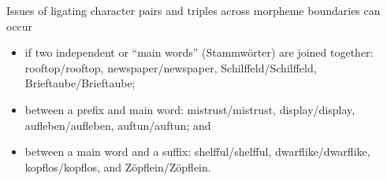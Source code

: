 \documentclass[12pt]{article}
\begin{document}
Issues of ligating character pairs and triples across morpheme boundaries can occur 
\begin{itemize}
\item if two independent or \enquote{main words} (Stammwörter) are joined together: \mbox{rooftop}\slash rooftop, \mbox{newspaper}\slash newspaper, \mbox{Schilffeld}\slash Schilffeld, \mbox{Brieftaube}\slash Brieftaube; \phantom{x}   
\item between a prefix and main word: mi\mbox{st}rust\slash mistrust, di\mbox{sp}lay\slash display, \mbox{aufleben}\slash aufleben, \mbox{auftun}\slash auftun; and \phantom{x}
\item between a main word and a suffix: \mbox{shelfful}\slash shelfful, \mbox{dwarflike}\slash  dwarflike, \mbox{kopflos}\slash kopflos, and \mbox{Zöpflein}\slash Zöpflein. \phantom{x}
\end{itemize}
\end{document}
